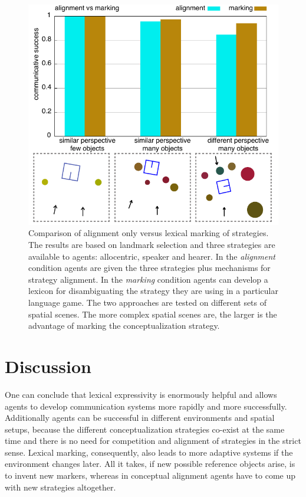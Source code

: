 \begin{figure}
\includegraphics[width=1.0\columnwidth]{figs/chunk-alignment-vs-marking-space-game-5--11}
\caption[Comparison of alignment versus lexical 
marking of strategies]{Comparison of alignment only versus lexical 
marking of strategies. The results are based on landmark selection 
and three strategies are available to agents: allocentric, 
speaker and hearer. In the \emph{alignment} condition agents 
are given the three strategies plus mechanisms for strategy alignment. 
In the \emph{marking} condition
agents can develop a lexicon for disambiguating the strategy 
they are using in a particular language game. The two approaches 
are tested on different sets of spatial scenes.
The more complex spatial scenes are, the larger is
the advantage of marking the conceptualization
strategy.}
\label{f:alignment-vs-marking}
\end{figure}
 
\section{Discussion}
One can conclude that lexical expressivity is enormously 
helpful and allows agents to develop 
communication systems more rapidly and more successfully. 
Additionally agents can be successful in different environments 
and spatial setups, because the different conceptualization
strategies co-exist at the same time and there is no need for 
competition and alignment of strategies 
in the strict sense. Lexical marking, consequently, also leads to 
more adaptive systems if the environment
changes later. All it takes, if new possible reference objects 
arise, is to invent new markers, whereas
in conceptual alignment agents have to come up with new strategies altogether. 


